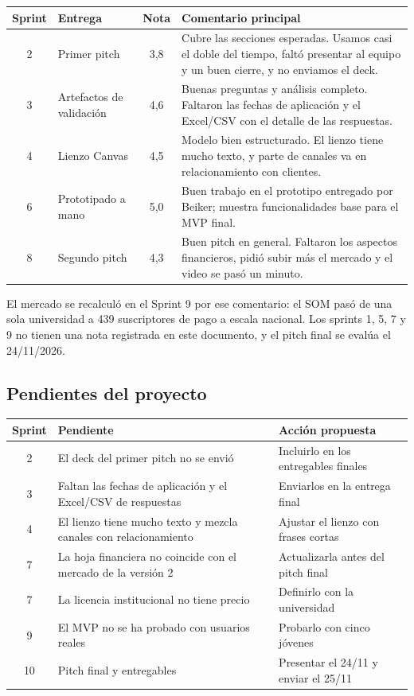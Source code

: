 \documentclass[11pt,a4paper]{article}
\begin{document}
\begin{tabularx}{\textwidth}{c l c X}
  \toprule
  \textbf{Sprint} & \textbf{Entrega} & \textbf{Nota} & \textbf{Comentario principal} \\
  \midrule
  2 & Primer pitch & 3,8 & Cubre las secciones esperadas. Usamos casi el doble del tiempo, faltó presentar al equipo y un buen cierre, y no enviamos el deck. \\
  3 & Artefactos de validación & 4,6 & Buenas preguntas y análisis completo. Faltaron las fechas de aplicación y el Excel/CSV con el detalle de las respuestas. \\
  4 & Lienzo Canvas & 4,5 & Modelo bien estructurado. El lienzo tiene mucho texto, y parte de canales va en relacionamiento con clientes. \\
  6 & Prototipado a mano & 5,0 & Buen trabajo en el prototipo entregado por Beiker; muestra funcionalidades base para el MVP final. \\
  8 & Segundo pitch & 4,3 & Buen pitch en general. Faltaron los aspectos financieros, pidió subir más el mercado y el video se pasó un minuto. \\
  \bottomrule
\end{tabularx}

{El mercado se recalculó en el Sprint 9 por ese comentario: el SOM pasó de una sola universidad a 439 suscriptores de pago a escala nacional. Los sprints 1, 5, 7 y 9 no tienen una nota registrada en este documento, y el pitch final se evalúa el 24/11/2026.}

\subsection{Pendientes del proyecto}
\begin{tabularx}{\textwidth}{c X X}
  \toprule
  \textbf{Sprint} & \textbf{Pendiente} & \textbf{Acción propuesta} \\
  \midrule
  2 & El deck del primer pitch no se envió & Incluirlo en los entregables finales \\
  3 & Faltan las fechas de aplicación y el Excel/CSV de respuestas & Enviarlos en la entrega final \\
  4 & El lienzo tiene mucho texto y mezcla canales con relacionamiento & Ajustar el lienzo con frases cortas \\
  7 & La hoja financiera no coincide con el mercado de la versión 2 & Actualizarla antes del pitch final \\
  7 & La licencia institucional no tiene precio & Definirlo con la universidad \\
  9 & El MVP no se ha probado con usuarios reales & Probarlo con cinco jóvenes \\
  10 & Pitch final y entregables & Presentar el 24/11 y enviar el 25/11 \\
  \bottomrule
\end{tabularx}
\end{document}

